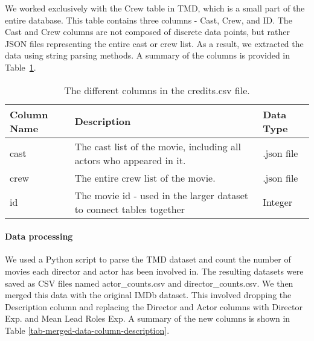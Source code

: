     \begin{multicols}{2}

        We worked exclusively with the Crew table in TMD, which is a small part of the
            entire database.
        This table contains three columns - Cast, Crew, and ID.
        The Cast and Crew columns are not composed of discrete data points, but rather
            JSON files representing the entire cast or crew list.
        As a result, we extracted the data using string parsing methods.
        A summary of the columns is provided in
            Table~\ref{tab-Credits-Column-Description}.

    \end{multicols}
    \begin{table}[h]
        \centering
        \begin{tabular}{lp{10cm}l}
            \toprule
            Column Name & Description                                                          & Data Type  \\
            \midrule
            cast        & The cast list of the movie, including all actors who appeared in it. & .json file \\
            crew        & The entire crew list of the movie.                                   & .json file \\
            id          & The movie id - used in the larger dataset to connect tables together & Integer    \\
            \bottomrule
        \end{tabular}
        \caption[short]{The different columns in the credits.csv file.}\label{tab-Credits-Column-Description}
    \end{table}
    \begin{multicols}{2}

        \paragraph{Data processing}
            We used a Python script to parse the TMD dataset and count the number of movies
                each director and actor has been involved in.
            The resulting datasets were saved as CSV files named actor\_counts.csv and
                director\_counts.csv.
            We then merged this data with the original IMDb dataset.
            This involved dropping the Description column and replacing the Director and
                Actor columns with Director Exp.
            and Mean Lead Roles Exp.
            A summary of the new columns is shown in Table
                \ref{tab-merged-data-column-description}.
    \end{multicols}
